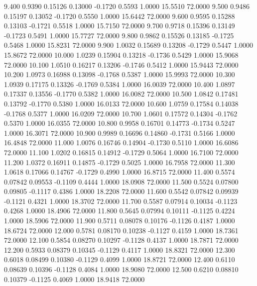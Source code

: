    9.400   0.9390   0.15126   0.13000  -0.1720   0.5593   1.0000  15.5510  72.0000
   9.500   0.9486   0.15197   0.13052  -0.1720   0.5550   1.0000  15.6442  72.0000
   9.600   0.9595   0.15288   0.13103  -0.1721   0.5518   1.0000  15.7150  72.0000
   9.700   0.9718   0.15396   0.13149  -0.1723   0.5491   1.0000  15.7727  72.0000
   9.800   0.9862   0.15526   0.13185  -0.1725   0.5468   1.0000  15.8231  72.0000
   9.900   1.0032   0.15689   0.13208  -0.1729   0.5447   1.0000  15.8672  72.0000
  10.000   1.0239   0.15904   0.13218  -0.1736   0.5429   1.0000  15.9068  72.0000
  10.100   1.0510   0.16217   0.13206  -0.1746   0.5412   1.0000  15.9443  72.0000
  10.200   1.0973   0.16988   0.13098  -0.1768   0.5387   1.0000  15.9993  72.0000
  10.300   1.0939   0.17175   0.13326  -0.1769   0.5384   1.0000  16.0039  72.0000
  10.400   1.0897   0.17337   0.13556  -0.1770   0.5382   1.0000  16.0082  72.0000
  10.500   1.0842   0.17481   0.13792  -0.1770   0.5380   1.0000  16.0133  72.0000
  10.600   1.0759   0.17584   0.14038  -0.1768   0.5377   1.0000  16.0209  72.0000
  10.700   1.0601   0.17572   0.14304  -0.1762   0.5370   1.0000  16.0355  72.0000
  10.800   0.9958   0.16701   0.14773  -0.1734   0.5247   1.0000  16.3071  72.0000
  10.900   0.9989   0.16696   0.14860  -0.1731   0.5166   1.0000  16.4848  72.0000
  11.000   1.0076   0.16746   0.14904  -0.1730   0.5110   1.0000  16.6086  72.0000
  11.100   1.0202   0.16815   0.14912  -0.1729   0.5064   1.0000  16.7100  72.0000
  11.200   1.0372   0.16911   0.14875  -0.1729   0.5025   1.0000  16.7958  72.0000
  11.300   1.0618   0.17066   0.14767  -0.1729   0.4990   1.0000  16.8715  72.0000
  11.400   0.5574   0.07842   0.09553  -0.1109   0.4444   1.0000  18.0908  72.0000
  11.500   0.5524   0.07800   0.09805  -0.1117   0.4386   1.0000  18.2208  72.0000
  11.600   0.5542   0.07842   0.09939  -0.1121   0.4321   1.0000  18.3702  72.0000
  11.700   0.5587   0.07914   0.10034  -0.1123   0.4268   1.0000  18.4906  72.0000
  11.800   0.5645   0.07994   0.10111  -0.1125   0.4224   1.0000  18.5906  72.0000
  11.900   0.5711   0.08078   0.10176  -0.1126   0.4187   1.0000  18.6724  72.0000
  12.000   0.5781   0.08170   0.10238  -0.1127   0.4159   1.0000  18.7361  72.0000
  12.100   0.5854   0.08270   0.10297  -0.1128   0.4137   1.0000  18.7871  72.0000
  12.200   0.5933   0.08379   0.10345  -0.1129   0.4117   1.0000  18.8321  72.0000
  12.300   0.6018   0.08499   0.10380  -0.1129   0.4099   1.0000  18.8721  72.0000
  12.400   0.6110   0.08639   0.10396  -0.1128   0.4084   1.0000  18.9080  72.0000
  12.500   0.6210   0.08810   0.10379  -0.1125   0.4069   1.0000  18.9418  72.0000
